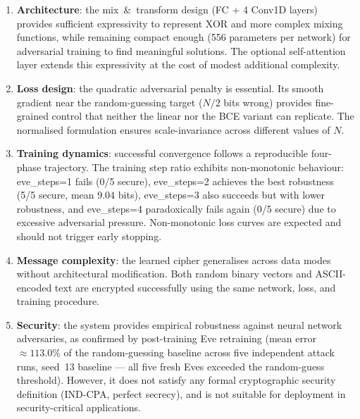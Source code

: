 \documentclass[12pt, a4paper]{article}
\begin{document}
\begin{enumerate}[leftmargin=2em, itemsep=5pt]

  \item \textbf{Architecture}: the mix~\&~transform design (FC + 4
        Conv1D layers) provides sufficient expressivity to represent
        XOR and more complex mixing functions, while remaining compact
        enough (556 parameters per network) for adversarial training
        to find meaningful solutions. The optional self-attention layer
        extends this expressivity at the cost of modest additional
        complexity.

  \item \textbf{Loss design}: the quadratic adversarial penalty is
        essential. Its smooth gradient near the random-guessing target
        ($N/2$ bits wrong) provides fine-grained control that neither
        the linear nor the BCE variant can replicate. The normalised
        formulation ensures scale-invariance across different values
        of $N$.

  \item \textbf{Training dynamics}: successful convergence follows a
        reproducible four-phase trajectory. The training step ratio exhibits non-monotonic behaviour:
        eve\_steps=1 fails (0/5 secure), eve\_steps=2 achieves the best
        robustness (5/5 secure, mean $9.04$ bits), eve\_steps=3 also
        succeeds but with lower robustness, and eve\_steps=4 paradoxically
        fails again (0/5 secure) due to excessive adversarial pressure. Non-monotonic
        loss curves are expected and should not trigger early stopping.

  \item \textbf{Message complexity}: the learned cipher generalises
        across data modes without architectural modification. Both random
        binary vectors and ASCII-encoded text are encrypted successfully
        using the same network, loss, and training procedure.

  \item \textbf{Security}: the system provides empirical robustness
        against neural network adversaries, as confirmed by
        post-training Eve retraining (mean error $\approx 113.0\%$ of
        the random-guessing baseline across five independent attack
        runs, seed~13 baseline --- all five fresh Eves exceeded the
        random-guess threshold). However, it does not satisfy any formal cryptographic
        security definition (IND-CPA, perfect secrecy), and is not
        suitable for deployment in security-critical applications.

\end{enumerate}
\end{document}
